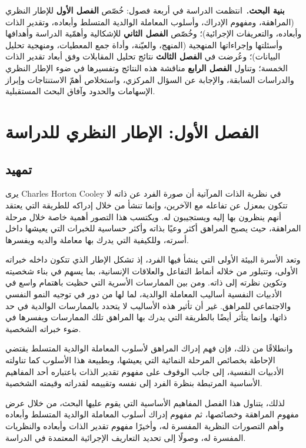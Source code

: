 \documentclass[12pt,oneside]{report}
\begin{document}
\medskip
\noindent\textbf{بنية البحث.}\ انتظمت الدراسة في أربعة فصول: خُصّص \textbf{الفصل الأول} للإطار
النظري (المراهقة، ومفهوم الإدراك، وأسلوب المعاملة الوالدية المتسلط وأبعاده، وتقدير الذات وأبعاده،
والتعريفات الإجرائية)؛ وخُصّص \textbf{الفصل الثاني} للإشكالية وأهمّية الدراسة وأهدافها وأسئلتها
وإجراءاتها المنهجية (المنهج، والعيّنة، وأداة جمع المعطيات، ومنهجية تحليل البيانات)؛ وعُرضت في
\textbf{الفصل الثالث} نتائج تحليل المقابلات وفق أبعاد تقدير الذات الخمسة؛ وتناول \textbf{الفصل
الرابع} مناقشة هذه النتائج وتفسيرها في ضوء الإطار النظري والدراسات السابقة، والإجابة عن السؤال
المركزي، واستخلاص أهمّ الاستنتاجات وإبراز الإسهامات والحدود وآفاق البحث المستقبلية.

\chapter*{الفصل الأول: الإطار النظري للدراسة}
\section*{تمهيد}
يرى Charles Horton Cooley في نظرية الذات المرآتية  أن صورة الفرد عن ذاته لا تتكون بمعزل عن تفاعله مع الآخرين، وإنما تنشأ من خلال إدراكه للطريقة التي يعتقد أنهم ينظرون بها إليه ويستجيبون له. ويكتسب هذا التصور أهمية خاصة خلال مرحلة المراهقة، حيث يصبح المراهق أكثر وعيًا بذاته وأكثر حساسية للخبرات التي يعيشها داخل أسرته، وللكيفية التي يدرك بها معاملة والديه ويفسرها.

وتعد الأسرة البيئة الأولى التي ينشأ فيها الفرد، إذ تشكل الإطار الذي تتكون داخله خبراته الأولى، وتتبلور من خلاله أنماط التفاعل والعلاقات الإنسانية، بما يسهم في بناء شخصيته وتكوين نظرته إلى ذاته. ومن بين الممارسات الأسرية التي حظيت باهتمام واسع في الأدبيات النفسية أساليب المعاملة الوالدية، لما لها من دور في توجيه النمو النفسي والاجتماعي للمراهق. غير أن تأثير هذه الأساليب لا يتحدد بالممارسات الوالدية في حد ذاتها، وإنما يتأثر أيضًا بالطريقة التي يدرك بها المراهق تلك الممارسات ويفسرها في ضوء خبراته الشخصية.

وانطلاقًا من ذلك، فإن فهم إدراك المراهق لأسلوب المعاملة الوالدية المتسلط يقتضي الإحاطة بخصائص المرحلة النمائية التي يعيشها، وبطبيعة هذا الأسلوب كما تناولته الأدبيات النفسية، إلى جانب الوقوف على مفهوم تقدير الذات باعتباره أحد المفاهيم الأساسية المرتبطة بنظرة الفرد إلى نفسه وتقييمه لقدراته وقيمته الشخصية.

لذلك، يتناول هذا الفصل المفاهيم الأساسية التي يقوم عليها البحث، من خلال عرض مفهوم المراهقة وخصائصها، ثم مفهوم إدراك أسلوب المعاملة الوالدية المتسلط وأبعاده وأهم التصورات النظرية المفسرة له، وأخيرًا مفهوم تقدير الذات وأبعاده والنظريات المفسرة له، وصولًا إلى تحديد التعاريف الإجرائية المعتمدة في الدراسة.
\end{document}

